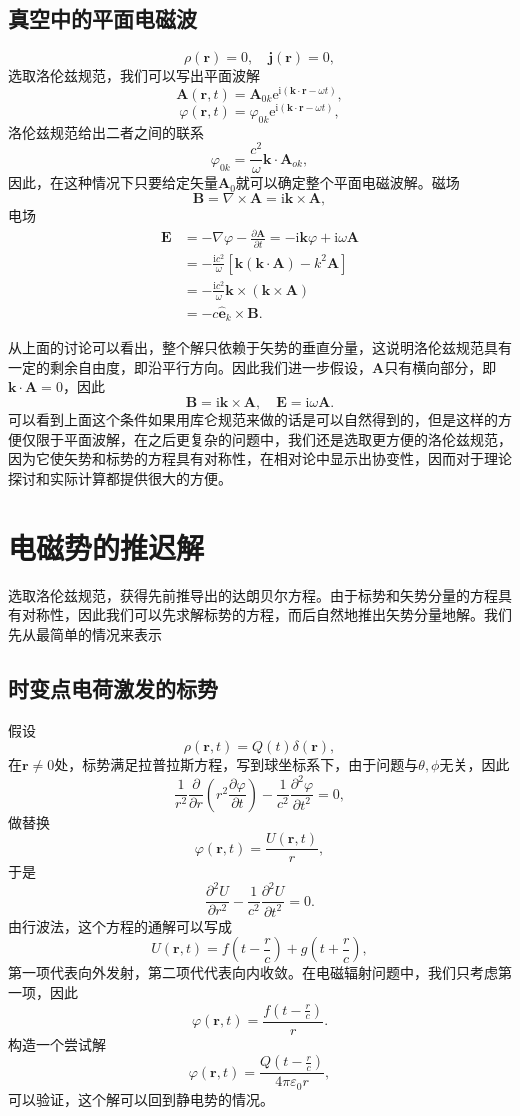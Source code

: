\documentclass[UTF8]{ctexbook}
\newcommand{\e}{\mathrm{e}}
\renewcommand{\b}{\boldsymbol}
\renewcommand{\i}{\mathrm{i}}
\numberwithin{equation}{chapter}
\begin{document}
	\subsection{真空中的平面电磁波}
	\[\rho(\b{r})=0,\quad \b{j}(\b{r})=0,\]
	选取洛伦兹规范，我们可以写出平面波解
	\[\b{A}(\b{r},t)=\b{A}_{0k}\e^{\i(\b{k}\cdot\b{r}-\omega t)},\]
	\[\varphi(\b{r},t)=\varphi_{0k}\e^{\i(\b{k}\cdot\b{r}-\omega t)},\]
	洛伦兹规范给出二者之间的联系
	\[\varphi_{0k}=\frac{c^2}{\omega}\b{k}\cdot\b{A}_{ok},\]
	因此，在这种情况下只要给定矢量$\b{A}_0$就可以确定整个平面电磁波解。磁场
	\[\b{B}=\nabla\times\b{A}=\i\b{k}\times\b{A},\]
	电场
	\begin{align*}
		\b{E}&=-\nabla\varphi-\frac{\partial \b{A}}{\partial t} = -\i\b{k}\varphi+\i\omega\b{A} \\
		&=-\frac{\i c^2}{\omega}\left[\b{k}(\b{k}\cdot\b{A})-k^2\b{A}\right] \\
		&=-\frac{\i c^2}{\omega}\b{k}\times(\b{k}\times\b{A}) \\
		&=-c\hat{\b{e}}_k\times\b{B}.
	\end{align*}
	
	 从上面的讨论可以看出，整个解只依赖于矢势的垂直分量，这说明洛伦兹规范具有一定的剩余自由度，即沿平行方向。因此我们进一步假设，$\b{A}$只有横向部分，即$\b{k}\cdot\b{A}=0$，因此
	 \[\b{B}=\i\b{k}\times\b{A},\quad \b{E}=\i\omega\b{A}.\]
	 可以看到上面这个条件如果用库仑规范来做的话是可以自然得到的，但是这样的方便仅限于平面波解，在之后更复杂的问题中，我们还是选取更方便的洛伦兹规范，因为它使矢势和标势的方程具有对称性，在相对论中显示出协变性，因而对于理论探讨和实际计算都提供很大的方便。
	 
	 \section{电磁势的推迟解}
	 选取洛伦兹规范，获得先前推导出的达朗贝尔方程。由于标势和矢势分量的方程具有对称性，因此我们可以先求解标势的方程，而后自然地推出矢势分量地解。我们先从最简单的情况来表示
	 
	 \subsection{时变点电荷激发的标势}
	 假设
	 \[\rho(\b{r},t)=Q(t)\delta(\b{r}),\]
	 在$\b{r}\neq 0$处，标势满足拉普拉斯方程，写到球坐标系下，由于问题与$\theta,\phi$无关，因此
	 \[\frac{1}{r^2}\frac{\partial }{\partial r}\left(r^2\frac{\partial \varphi}{\partial t}\right)-\frac{1}{c^2}\frac{\partial^2\varphi}{\partial t^2}=0,\]
	 做替换
	 \[\varphi(\b{r},t)=\frac{U(\b{r},t)}{r},\]
	 于是
	 \[\frac{\partial^2U}{\partial r^2}-\frac{1}{c^2}\frac{\partial^2 U}{\partial t^2}=0.\]
	 由行波法，这个方程的通解可以写成
	 \[U(\b{r},t)=f(t-\frac{r}{c})+g(t+\frac{r}{c}),\]
	 第一项代表向外发射，第二项代代表向内收敛。在电磁辐射问题中，我们只考虑第一项，因此
	 \[\varphi(\b{r},t)=\frac{f(t-\frac{r}{c})}{r}.\]
	 构造一个尝试解
	 \[\varphi(\b{r},t)=\frac{Q\left(t-\frac{r}{c}\right)}{4\pi\varepsilon_0r},\]
	 可以验证，这个解可以回到静电势的情况。
	 
\end{document}
